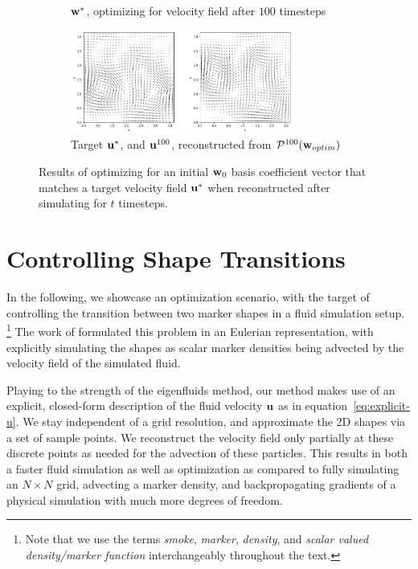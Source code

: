 \begin{figure}
\begin{subfigure}{\textwidth}
{    $\vb{w}^*$, optimizing for velocity field after $100$ timesteps\\}
    \label{fig:100-timesteps-coeffs}
  \end{subfigure}\par\medskip
  \begin{subfigure}{\textwidth}
    \centering
    \includegraphics[width=0.8\textwidth]{figures/finding-initial-velocities/t_100_velocities.png}
    \caption{Target $\vb{u}^*$, and $\vb{u}^{100}$, reconstructed from
      $\mathcal{P}^{100}(\vb{w}_{optim})$}
    \label{fig:100-timesteps-vel}
  \end{subfigure}
  \caption{Results of optimizing for an initial $\vb{w}_0$ basis coefficient
    vector that matches a target velocity field $\vb{u}^*$ when reconstructed
    after simulating for $t$ timesteps.
  }
  \label{fig:matching-velocities}
\end{figure}

\section{Controlling Shape Transitions}
\label{section:controlling-shape-transitions}
In the following, we showcase an optimization scenario, with the target of
controlling the transition between two marker shapes in a fluid simulation
setup. 
\footnote{Note that we use the terms \textit{smoke}, \textit{marker},
\textit{density}, and \textit{scalar valued density/marker function}
interchangeably throughout the text.}
The work of \citet{holl2019pdecontrol} formulated this problem in an
Eulerian representation, with explicitly simulating the shapes as scalar marker
densities being advected by the velocity field of the simulated fluid. 

Playing to the strength of the eigenfluids method, our method makes use of an
explicit, closed-form description of the fluid velocity $\vb{u}$ as in
equation~\eqref{eq:explicit-u}. We stay independent of a grid resolution, and
approximate the 2D shapes via a set of sample points. We reconstruct the
velocity field only partially at these discrete points as needed for the
advection of these particles. This results in both a faster fluid simulation as
well as optimization as compared to fully simulating an $N\times N$ grid,
advecting a marker density, and backpropagating gradients of a physical
simulation with much more degrees of freedom.

